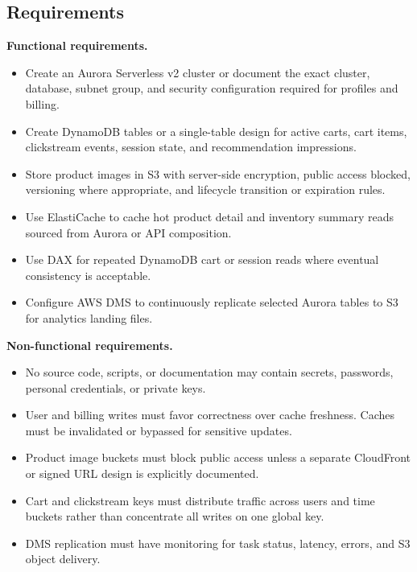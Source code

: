 \subsection*{Requirements}
\textbf{Functional requirements.}
\begin{itemize}
    \item Create an Aurora Serverless v2 cluster or document the exact cluster, database, subnet group, and security configuration required for profiles and billing.
    \item Create DynamoDB tables or a single-table design for active carts, cart items, clickstream events, session state, and recommendation impressions.
    \item Store product images in S3 with server-side encryption, public access blocked, versioning where appropriate, and lifecycle transition or expiration rules.
    \item Use ElastiCache to cache hot product detail and inventory summary reads sourced from Aurora or API composition.
    \item Use DAX for repeated DynamoDB cart or session reads where eventual consistency is acceptable.
    \item Configure AWS DMS to continuously replicate selected Aurora tables to S3 for analytics landing files.
\end{itemize}
\textbf{Non-functional requirements.}
\begin{itemize}
    \item No source code, scripts, or documentation may contain secrets, passwords, personal credentials, or private keys.
    \item User and billing writes must favor correctness over cache freshness. Caches must be invalidated or bypassed for sensitive updates.
    \item Product image buckets must block public access unless a separate CloudFront or signed URL design is explicitly documented.
    \item Cart and clickstream keys must distribute traffic across users and time buckets rather than concentrate all writes on one global key.
    \item DMS replication must have monitoring for task status, latency, errors, and S3 object delivery.
\end{itemize}
